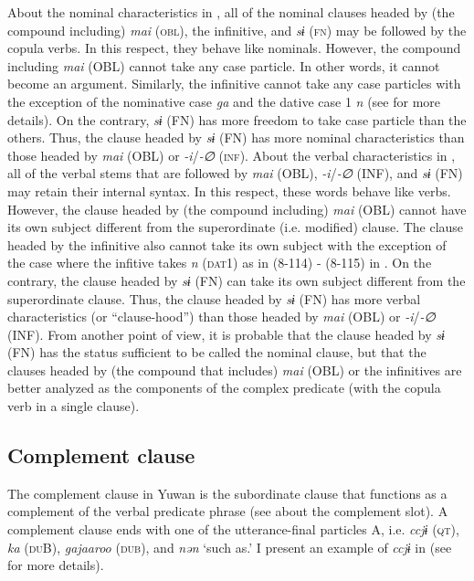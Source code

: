 About the nominal characteristics in , all of the nominal clauses headed by (the compound including) \textit{mai} (\textsc{obl}), the infinitive, and \textit{sɨ} (\textsc{fn}) may be followed by the copula verbs. In this respect, they behave like nominals. However, the compound including \textit{mai} (OBL) cannot take any case particle. In other words, it cannot become an argument. Similarly, the infinitive cannot take any case particles with the exception of the nominative case \textit{ga} and the dative case 1 \textit{n} (see  for more details). On the contrary, \textit{sɨ} (FN) has more freedom to take case particle than the others. Thus, the clause headed by \textit{sɨ} (FN) has more nominal characteristics than those headed by \textit{mai} (OBL) or \textit{{}-i}/\textit{{}-∅} (\textsc{inf}). About the verbal characteristics in , all of the verbal stems that are followed by \textit{mai} (OBL), \textit{{}-i}/\textit{{}-∅} (INF), and \textit{sɨ} (FN) may retain their internal syntax. In this respect, these words behave like verbs. However, the clause headed by (the compound including) \textit{mai} (OBL) cannot have its own subject different from the superordinate (i.e. modified) clause. The clause headed by the infinitive also cannot take its own subject with the exception of the case where the infitive takes \textit{n} (\textsc{dat}1) as in (8-114) - (8-115) in . On the contrary, the clause headed by \textit{sɨ} (FN) can take its own subject different from the superordinate clause. Thus, the clause headed by \textit{sɨ} (FN) has more verbal characteristics (or “clause-hood”) than those headed by \textit{mai} (OBL) or \textit{{}-i}/\textit{{}-∅} (INF). From another point of view, it is probable that the clause headed by \textit{sɨ} (FN) has the status sufficient to be called the nominal clause, but that the clauses headed by (the compound that includes) \textit{mai} (OBL) or the infinitives are better analyzed as the components of the complex predicate (with the copula verb in a single clause).

\subsection{Complement clause}\label{sec:11.1.4}

The complement clause in Yuwan is the subordinate clause that functions as a complement of the verbal predicate phrase (see  about the complement slot). A complement clause ends with one of the utterance-final particles A, i.e. \textit{ccjɨ} (\textsc{qt}), \textit{ka} (\textsc{du}B), \textit{gajaaroo} (\textsc{dub}), and \textit{nən} ‘such as.’ I present an example of \textit{ccjɨ} in  (see  for more details).

